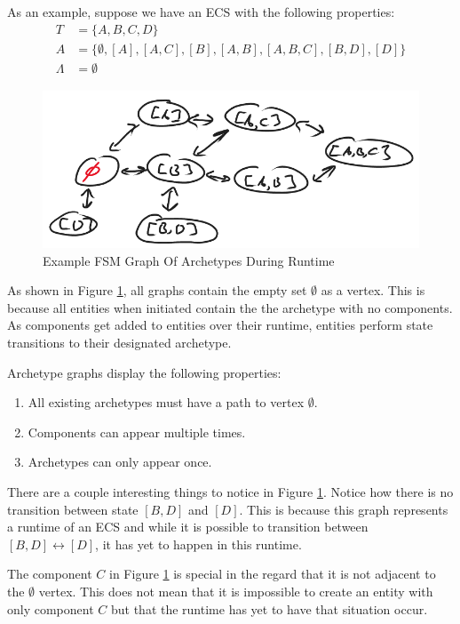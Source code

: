 As an example, suppose we have an ECS with the following properties:
\begin{align}
    T &= \{A,B,C,D\} \\
    A &= \{ \emptyset, [A] , [A,C] ,[B], [A,B], [A,B,C], [B,D], [D]\} \\
    \Lambda &= \emptyset
\end{align}

\begin{figure}[htbp]
    \centering
    \includegraphics[width=0.5\linewidth]{resources/graph1.png}
    \caption{Example FSM Graph Of Archetypes During Runtime}
    \label{fig:graph1}
\end{figure}

As shown in Figure \ref{fig:graph1}, all graphs contain the empty set $\emptyset$ as a vertex. This is because all entities when initiated contain the the archetype with no components. As components get added to entities over their runtime, entities perform state transitions to their designated archetype. 

Archetype graphs display the following properties:

\begin{enumerate}
    \item All existing archetypes must have a path to vertex $\emptyset$.
    \item Components can appear multiple times.
    \item Archetypes can only appear once.
\end{enumerate}

There are a couple interesting things to notice in Figure \ref{fig:graph1}. Notice how there is no transition between state $[B,D]$ and $[D]$. This is because this graph represents a runtime of an ECS and while it is possible to transition between $[B,D] \leftrightarrow [D]$, it has yet to happen in this runtime. 

The component $C$ in Figure \ref{fig:graph1} is special in the regard that it is not adjacent to the $\emptyset$ vertex. This does not mean that it is impossible to create an entity with only component $C$ but that the runtime has yet to have that situation occur.

